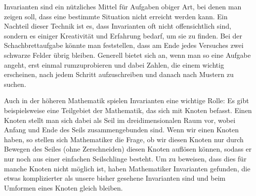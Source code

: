 \documentclass[a4paper,ngerman,12pt]{scrartcl}
\theoremstyle{definition}
\begin{document}
Invarianten sind ein nützliches Mittel für Aufgaben obiger Art, bei denen man zeigen soll, dass eine bestimmte Situation nicht erreicht werden kann. Ein Nachteil dieser Technik ist es, dass Invarianten oft nicht offensichtlich sind, sondern es einiger Kreativität und Erfahrung bedarf, um sie zu finden. Bei der Schachbrettaufgabe könnte man feststellen, dass am Ende jedes Versuches zwei schwarze Felder übrig bleiben. Generell bietet sich an, wenn man so eine Aufgabe angeht, erst einmal rumzuprobieren und dabei Zahlen, die einem wichtig erscheinen, nach jedem Schritt aufzuschreiben und danach nach Mustern zu suchen.

Auch in der höheren Mathematik spielen Invarianten eine wichtige Rolle: Es gibt beispielsweise eine Teilgebiet der Mathematik, das sich mit Knoten befasst. Einen Knoten stellt man sich dabei als Seil im dreidimensionalen Raum vor, wobei Anfang und Ende des Seils zusammengebunden sind. Wenn wir einen Knoten haben, so stellen sich Mathematiker die Frage, ob wir diesen Knoten nur durch Bewegen des Seiles (ohne Zerschneiden) diesen Knoten auflösen können, sodass er nur noch aus einer einfachen Seilschlinge besteht. Um zu beweisen, dass dies für manche Knoten nicht möglich ist, haben Mathematiker Invarianten gefunden, die etwas komplizierter als unsere bisher gesehene Invarianten sind und beim Umformen eines Knoten gleich bleiben.

\begin{center}
\end{center}
\end{document}
